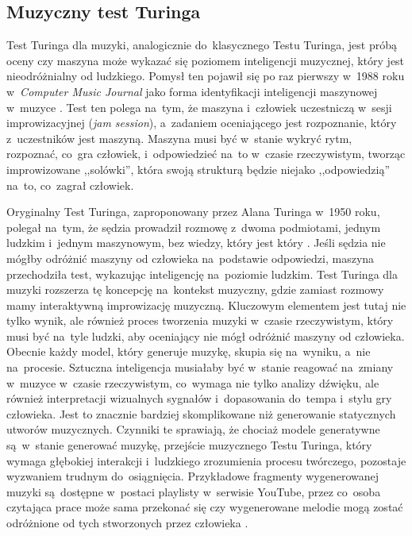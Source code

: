 \documentclass[data-science]{agh-wi} %
\begin{document}
\subsection{Muzyczny test Turinga}
Test Turinga dla muzyki, analogicznie do~klasycznego Testu Turinga, jest próbą oceny czy maszyna może wykazać się poziomem inteligencji muzycznej, który jest nieodróżnialny od ludzkiego. Pomysł ten pojawił się po raz pierwszy w~1988 roku w~\textit{Computer Music Journal} jako forma identyfikacji inteligencji maszynowej w~muzyce \cite{music_turing_test}. Test ten polega na~tym, że maszyna i~człowiek uczestniczą w~sesji improwizacyjnej (\textit{jam session}), a~zadaniem oceniającego jest rozpoznanie, który z~uczestników jest maszyną. Maszyna musi być w~stanie wykryć rytm, rozpoznać, co~gra człowiek, i~odpowiedzieć na~to w~czasie rzeczywistym, tworząc improwizowane ,,solówki'', która swoją strukturą będzie niejako ,,odpowiedzią'' na~to, co~zagrał człowiek.

Oryginalny Test Turinga, zaproponowany przez Alana Turinga w~1950 roku, polegał na~tym, że sędzia prowadził rozmowę z~dwoma podmiotami, jednym ludzkim i~jednym maszynowym, bez wiedzy, który jest który \cite{turing_test}. Jeśli sędzia nie mógłby odróżnić maszyny od człowieka na~podstawie odpowiedzi, maszyna przechodziła test, wykazując inteligencję na~poziomie ludzkim. Test Turinga dla muzyki rozszerza tę koncepcję na~kontekst muzyczny, gdzie zamiast rozmowy mamy interaktywną improwizację muzyczną. Kluczowym elementem jest tutaj nie tylko wynik, ale również proces tworzenia muzyki w~czasie rzeczywistym, który musi być na~tyle ludzki, aby oceniający nie mógł odróżnić maszyny od człowieka. Obecnie każdy model, który generuje muzykę, skupia się na~wyniku, a~nie na~procesie. Sztuczna inteligencja musiałaby być w~stanie reagować na~zmiany w~muzyce w~czasie rzeczywistym, co~wymaga nie tylko analizy dźwięku, ale również interpretacji wizualnych sygnałów i~dopasowania do~tempa i~stylu gry człowieka. Jest to znacznie bardziej skomplikowane niż generowanie statycznych utworów muzycznych. Czynniki te sprawiają, że chociaż modele generatywne są~w~stanie generować muzykę, przejście muzycznego Testu Turinga, który wymaga głębokiej interakcji i~ludzkiego zrozumienia procesu twórczego, pozostaje wyzwaniem trudnym do~osiągnięcia. Przykładowe fragmenty wygenerowanej muzyki są~dostępne w~postaci playlisty w~serwisie YouTube, przez co~osoba czytająca prace może sama przekonać się czy wygenerowane melodie mogą zostać odróżnione od tych stworzonych przez człowieka \cite*{playlist}.
\end{document}
